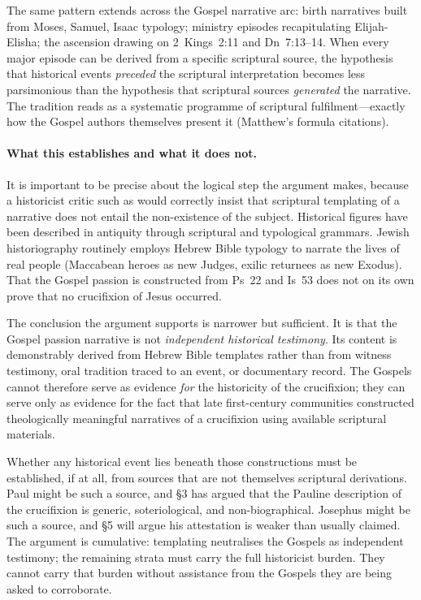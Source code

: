 \documentclass[12pt,oneside]{article}
\begin{document}
The same pattern extends across the Gospel narrative arc: birth
narratives built from Moses, Samuel, Isaac typology; ministry
episodes recapitulating Elijah-Elisha; the ascension drawing on
2~Kings~2:11 and Dn~7:13--14.  When every major episode can be
derived from a specific scriptural source, the hypothesis that
historical events \textit{preceded} the scriptural interpretation
becomes less parsimonious than the hypothesis that scriptural
sources \textit{generated} the narrative.  The tradition reads
as a systematic programme of scriptural fulfilment---exactly how
the Gospel authors themselves present it (Matthew's formula
citations).

\paragraph{What this establishes and what it does not.}
It is important to be precise about the logical step the argument
makes, because a historicist critic such as \citet{Allison2010}
would correctly insist that scriptural templating of a narrative
does not entail the non-existence of the subject.  Historical
figures have been described in antiquity through scriptural and
typological grammars.  Jewish historiography routinely employs
Hebrew Bible typology to narrate the lives of real people
(Maccabean heroes as new Judges, exilic returnees as new Exodus).
That the Gospel passion is constructed from Ps~22 and Is~53 does
not on its own prove that no crucifixion of Jesus occurred.

The conclusion the argument supports is narrower but sufficient.
It is that the Gospel passion narrative is not \textit{independent
historical testimony}.  Its content is demonstrably derived from
Hebrew Bible templates rather than from witness testimony, oral
tradition traced to an event, or documentary record.  The Gospels
cannot therefore serve as evidence \textit{for} the historicity
of the crucifixion; they can serve only as evidence for the fact
that late first-century communities constructed theologically
meaningful narratives of a crucifixion using available scriptural
materials.

Whether any historical event lies beneath those constructions must
be established, if at all, from sources that are not themselves
scriptural derivations.  Paul might be such a source, and §3 has
argued that the Pauline description of the crucifixion is
generic, soteriological, and non-biographical.  Josephus might be
such a source, and §5 will argue his attestation is weaker than
usually claimed.  The argument is cumulative: templating
neutralises the Gospels as independent testimony; the remaining
strata must carry the full historicist burden.  They cannot carry
that burden without assistance from the Gospels they are being
asked to corroborate.
\end{document}
